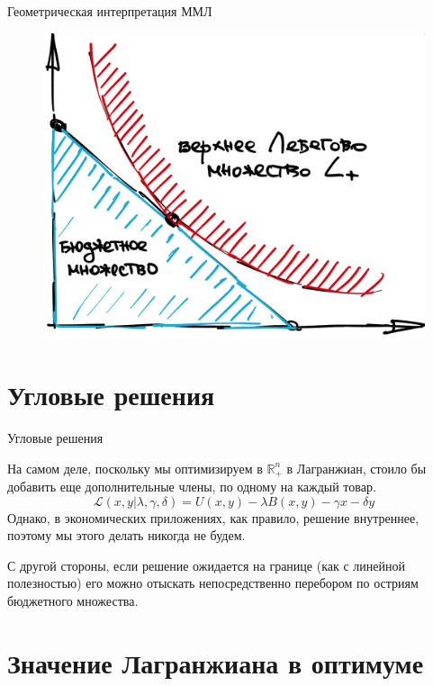 \documentclass{beamer}
\begin{document}
\begin{frame}{Геометрическая интерпретация ММЛ}

\begin{figure}[hbt]
\centering
\includegraphics[width=.8 \textwidth]{tangency.png}
\end{figure}

\end{frame}

\section{Угловые решения}

\begin{frame}{Угловые решения}

На самом деле, поскольку мы оптимизируем в $\mathbb{R}^n_{+}$ в Лагранжиан, стоило бы добавить еще дополнительные члены, по одному на каждый товар. 
$$ \mathcal{L}(x,y | \lambda, \gamma, \delta) = U(x,y) - \lambda B(x,y) - \gamma x - \delta y$$
Однако, в экономических приложениях, как правило, решение внутреннее, поэтому мы этого делать никогда не будем.

С другой стороны, \alert{если решение ожидается на границе} (как с линейной полезностью) \alert{его можно отыскать непосредственно перебором по остриям бюджетного множества}.

\end{frame}

\section{Значение Лагранжиана в оптимуме}
\end{document}
